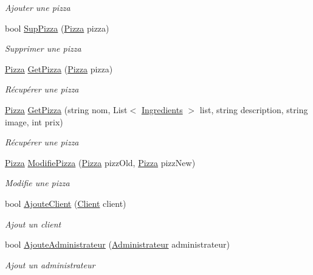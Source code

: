 \begin{DoxyCompactItemize}
\begin{DoxyCompactList}\small\item\em Ajouter une pizza \end{DoxyCompactList}\item 
bool \hyperlink{classModele_1_1Manager_ae68e67c9a17910118dd74fa2230383b0}{Sup\+Pizza} (\hyperlink{classModele_1_1Pizza}{Pizza} pizza)
\begin{DoxyCompactList}\small\item\em Supprimer une pizza \end{DoxyCompactList}\item 
\hyperlink{classModele_1_1Pizza}{Pizza} \hyperlink{classModele_1_1Manager_a8c2edb35d4e642e0478beda5f7855ca5}{Get\+Pizza} (\hyperlink{classModele_1_1Pizza}{Pizza} pizza)
\begin{DoxyCompactList}\small\item\em Récupérer une pizza \end{DoxyCompactList}\item 
\hyperlink{classModele_1_1Pizza}{Pizza} \hyperlink{classModele_1_1Manager_af439d9ef7292920762fc57a97c334716}{Get\+Pizza} (string nom, List$<$ \hyperlink{namespaceModele_a001a8e89e56a724f24a249ba98080d41}{Ingredients} $>$ list, string description, string image, int prix)
\begin{DoxyCompactList}\small\item\em Récupérer une pizza \end{DoxyCompactList}\item 
\hyperlink{classModele_1_1Pizza}{Pizza} \hyperlink{classModele_1_1Manager_ab9995ba4bcc7203db156eb2096655036}{Modifie\+Pizza} (\hyperlink{classModele_1_1Pizza}{Pizza} pizz\+Old, \hyperlink{classModele_1_1Pizza}{Pizza} pizz\+New)
\begin{DoxyCompactList}\small\item\em Modifie une pizza \end{DoxyCompactList}\item 
bool \hyperlink{classModele_1_1Manager_ac039c39ae05fd7b3ef9fae78d2332330}{Ajoute\+Client} (\hyperlink{classModele_1_1Client}{Client} client)
\begin{DoxyCompactList}\small\item\em Ajout un client \end{DoxyCompactList}\item 
bool \hyperlink{classModele_1_1Manager_a4e1ad1318c129128b7c375aa7c6a42e7}{Ajoute\+Administrateur} (\hyperlink{classModele_1_1Administrateur}{Administrateur} administrateur)
\begin{DoxyCompactList}\small\item\em Ajout un administrateur \end{DoxyCompactList}\item 

\end{DoxyCompactItemize}

